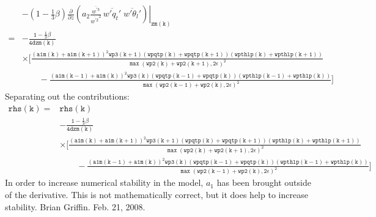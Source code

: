 \documentclass[11pt,fleqn]{article}
\newcommand{\ptlder}[2]{\frac{\partial #1}{\partial #2}}
\begin{document}
\begin{equation}
\begin{split}
& - \left. \left( 1 - \frac{1}{3}\beta \right)
       \ptlder{}{z}
         \left( 
           a_2
           \frac{\overline{w^{'3}}}{\overline{w^{'2}}^2} \,
           \overline{w'q_t'} \; \overline{w'\theta_l'}
         \right) \right|_{\mathtt{zm(k)}} \\
=& \mathtt{
   - \frac{1 - \frac{1}{3}\beta}{4 dzm(k)} } \\
 & \mathtt{
     \times \bigg[ \frac{\left(a1m(k)+a1m(k+1)\right)^2 wp3(k+1) 
                  \left(wpqtp(k)+wpqtp(k+1)\right)\left(wpthlp(k)+wpthlp(k+1)\right)}
                 {\max\left(wp2(k)+wp2(k+1),2\epsilon\right)^2} } \\
 & \mathtt{ \quad \quad
           -\frac{\left(a1m(k-1)+a1m(k)\right)^2 wp3(k) 
                  \left(wpqtp(k-1)+wpqtp(k)\right)\left(wpthlp(k-1)+wpthlp(k)\right)}
                 {\max\left(wp2(k-1)+wp2(k),2\epsilon\right)^2}
     \bigg]
   }
\end{split}
\end{equation}
%
Separating out the contributions:
%
\begin{equation}
\begin{split}
\mathtt{rhs(k)} =& \mathtt{rhs(k)} \\
 & \mathtt{ - \frac{1 - \frac{1}{3}\beta}{4 dzm(k)} } \\
 & \mathtt{ \times 
      \bigg[ \frac{\left(a1m(k)+a1m(k+1)\right)^2 wp3(k+1) 
                   \left(wpqtp(k)+wpqtp(k+1)\right) 
                   \left(wpthlp(k)+wpthlp(k+1)\right)}
                  {\max\left(wp2(k)+wp2(k+1),2\epsilon\right)^2} } \\
 & \mathtt{ \quad \quad
            -\frac{\left(a1m(k-1)+a1m(k)\right)^2 wp3(k) 
                   \left(wpqtp(k-1)+wpqtp(k)\right) 
                   \left(wpthlp(k-1)+wpthlp(k)\right)}
                  {\max\left(wp2(k-1)+wp2(k),2\epsilon\right)^2}
      \bigg]
   }
\end{split}
\end{equation}
%
In order to increase numerical stability in the model, $a_{1}$ has been brought
outside of the derivative.  This is not mathematically correct, but it does 
help to increase stability.  Brian Griffin.  Feb. 21, 2008.
% 
\end{document}

